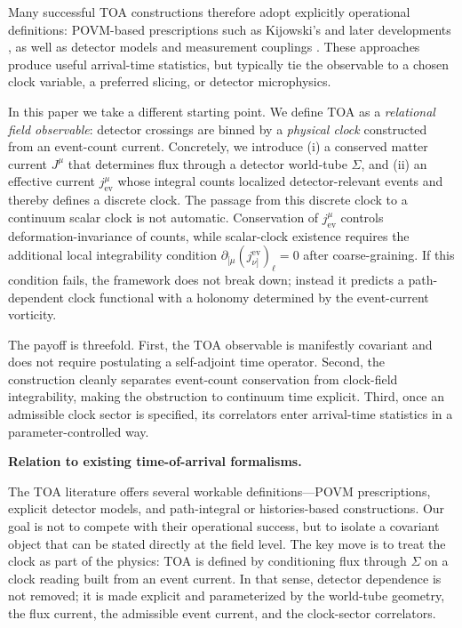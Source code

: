 \documentclass[11pt, a4paper]{article}
\theoremstyle{definition}
\theoremstyle{plain}
\theoremstyle{remark}
\numberwithin{equation}{section}
\begin{document}
        Many successful TOA constructions therefore adopt explicitly operational definitions: POVM-based prescriptions such as Kijowski's \cite{Kijowski1974} and later developments \cite{Giannitrapani1997,Muga2008}, as well as detector models and measurement couplings \cite{ColosiOeckl2025TimeOperatorTOA}. These approaches produce useful arrival-time statistics, but typically tie the observable to a chosen clock variable, a preferred slicing, or detector microphysics.
        
        In this paper we take a different starting point. We define TOA as a \emph{relational field observable}: detector crossings are binned by a \emph{physical clock} constructed from an event-count current. Concretely, we introduce (i) a conserved matter current $J^\mu$ that determines flux through a detector world-tube $\Sigma$, and (ii) an effective current $j^\mu_{\mathrm{ev}}$ whose integral counts localized detector-relevant events and thereby defines a discrete clock. The passage from this discrete clock to a continuum scalar clock is not automatic. Conservation of $j^\mu_{\mathrm{ev}}$ controls deformation-invariance of counts, while scalar-clock existence requires the additional local integrability condition $\partial_{[\mu}(j^{\mathrm{ev}}_{\nu]})_\ell=0$ after coarse-graining. If this condition fails, the framework does not break down; instead it predicts a path-dependent clock functional with a holonomy determined by the event-current vorticity.
        
        The payoff is threefold. First, the TOA observable is manifestly covariant and does not require postulating a self-adjoint time operator. Second, the construction cleanly separates event-count conservation from clock-field integrability, making the obstruction to continuum time explicit. Third, once an admissible clock sector is specified, its correlators enter arrival-time statistics in a parameter-controlled way.
        
        \medskip\noindent\textbf{Relation to existing time-of-arrival formalisms.}\par
            The TOA literature offers several workable definitions---POVM prescriptions, explicit detector models, and path-integral or histories-based constructions. Our goal is not to compete with their operational success, but to isolate a covariant object that can be stated directly at the field level. The key move is to treat the clock as part of the physics: TOA is defined by conditioning flux through $\Sigma$ on a clock reading built from an event current. In that sense, detector dependence is not removed; it is made explicit and parameterized by the world-tube geometry, the flux current, the admissible event current, and the clock-sector correlators.
        
\end{document}
